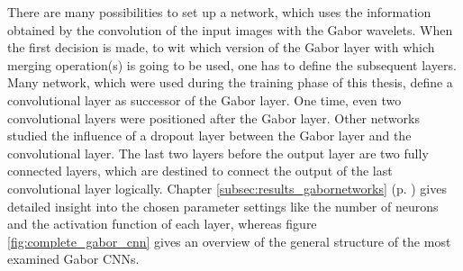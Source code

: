 \documentclass[11pt, a4paper]{article}
\newcommand\myref[1]{\ref{#1} (p. \pageref{#1})}
\begin{document}
There are many possibilities to set up a network, which uses the information obtained by the convolution of the input images with the Gabor wavelets. When the first decision is made, to wit which version of the Gabor layer with which merging operation(s) is going to be used, one has to define the subsequent layers. Many network, which were used during the training phase of this thesis, define a convolutional layer as successor of the Gabor layer. One time, even two convolutional layers were positioned after the Gabor layer. Other networks studied the influence of a dropout layer between the Gabor layer and the convolutional layer. The last two layers before the output layer are two fully connected layers, which are destined to connect the output of the last convolutional layer logically. Chapter \myref{subsec:results_gabornetworks} gives detailed insight into the chosen parameter settings like the number of neurons and the activation function of each layer, whereas figure \ref{fig:complete_gabor_cnn} gives an overview of the general structure of the most examined Gabor \acp{CNN}.




\newpage

\end{document}
